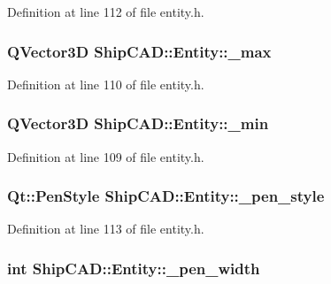 Definition at line 112 of file entity.\-h.

\hypertarget{classShipCAD_1_1Entity_a30e4f9cb421987cebd07737a554275eb}{
\subsubsection[{\-\_\-max}]{\setlength{\rightskip}{0pt plus 5cm}Q\-Vector3\-D Ship\-C\-A\-D\-::\-Entity\-::\-\_\-max\hspace{0.3cm}{\ttfamily [protected]}}}\label{classShipCAD_1_1Entity_a30e4f9cb421987cebd07737a554275eb}


Definition at line 110 of file entity.\-h.

\hypertarget{classShipCAD_1_1Entity_a414d4ff1ee308d47a5052910c3b34f7b}{
\subsubsection[{\-\_\-min}]{\setlength{\rightskip}{0pt plus 5cm}Q\-Vector3\-D Ship\-C\-A\-D\-::\-Entity\-::\-\_\-min\hspace{0.3cm}{\ttfamily [protected]}}}\label{classShipCAD_1_1Entity_a414d4ff1ee308d47a5052910c3b34f7b}


Definition at line 109 of file entity.\-h.

\hypertarget{classShipCAD_1_1Entity_ac53123be976cd9739ad1657573d67d97}{
\subsubsection[{\-\_\-pen\-\_\-style}]{\setlength{\rightskip}{0pt plus 5cm}Qt\-::\-Pen\-Style Ship\-C\-A\-D\-::\-Entity\-::\-\_\-pen\-\_\-style\hspace{0.3cm}{\ttfamily [protected]}}}\label{classShipCAD_1_1Entity_ac53123be976cd9739ad1657573d67d97}


Definition at line 113 of file entity.\-h.

\hypertarget{classShipCAD_1_1Entity_a5a9892a0d84d2cfdcd3a5dabf662a595}{
\subsubsection[{\-\_\-pen\-\_\-width}]{\setlength{\rightskip}{0pt plus 5cm}int Ship\-C\-A\-D\-::\-Entity\-::\-\_\-pen\-\_\-width\hspace{0.3cm}{\ttfamily [protected]}}}\label{classShipCAD_1_1Entity_a5a9892a0d84d2cfdcd3a5dabf662a595}


